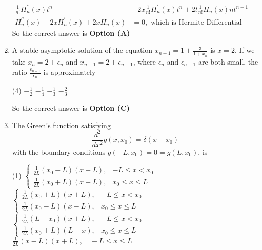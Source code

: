 \begin{enumerate}[label=\color{ocre}\textbf{\arabic*.}]
\begin{answer}
\begin{align*}
		\frac{1}{n !} H_{n}^{\prime \prime}(x) t^{n}&-2 x \frac{1}{n !} H_{n}^{\prime}(x) t^{n}+2 t \frac{1}{n !} H_{n}(x) n t^{n-1}\\
		H_{n}^{\prime \prime}(x)-2 x H_{n}^{\prime}(x)+2 x H_{n}(x)&=0,\text{ which is Hermite Differential Equation.}
		\end{align*}
		So the correct answer is \textbf{Option (A)}
	\end{answer}
	\item A stable asymptotic solution of the equation $x_{n+1}=1+\frac{3}{1+x_{n}}$ is $x=2$. If we take $x_{n}=2+\epsilon_{n}$ and $x_{n+1}=2+\epsilon_{n+1}$, where $\epsilon_{n}$ and $\epsilon_{n+1}$ are both small, the ratio $\frac{\epsilon_{n+1}}{\epsilon_{n}}$ is approximately
	{}
	\begin{tasks}(4)
		\task[\textbf{A.}] $-\frac{1}{2}$
		\task[\textbf{B.}] $-\frac{1}{4}$
		\task[\textbf{C.}]  $-\frac{1}{3}$
		\task[\textbf{D.}] $-\frac{2}{3}$
	\end{tasks}
	\begin{answer}
		So the correct answer is \textbf{Option (C)}
	\end{answer}
	\item  The Green's function satisfying
	$$
	\frac{d^{2}}{d x^{2}} g\left(x, x_{0}\right)=\delta\left(x-x_{0}\right)
	$$
	with the boundary conditions $g\left(-L, x_{0}\right)=0=g\left(L, x_{0}\right)$, is
	{}
	\begin{tasks}(1)
		\task[\textbf{A.}] $\left\{\begin{array}{ll}\frac{1}{2 L}\left(x_{0}-L\right)(x+L), & -L \leq x<x_{0} \\ \frac{1}{2 L}\left(x_{0}+L\right)(x-L), & x_{0} \leq x \leq L\end{array}\right.$
		\task[\textbf{B.}]  $\left\{\begin{array}{ll}\frac{1}{2 L}\left(x_{0}+L\right)(x+L), & -L \leq x<x_{0} \\ \frac{1}{2 L}\left(x_{0}-L\right)(x-L), & x_{0} \leq x \leq L\end{array}\right.$
		\task[\textbf{C.}] $\left\{\begin{array}{ll}\frac{1}{2 L}\left(L-x_{0}\right)(x+L), & -L \leq x<x_{0} \\ \frac{1}{2 L}\left(x_{0}+L\right)(L-x), & x_{0} \leq x \leq L\end{array}\right.$
		\task[\textbf{D.}] $\frac{1}{2 L}(x-L)(x+L), \quad-L \leq x \leq L$
	\end{tasks}
	\begin{answer}

\end{answer}
\end{enumerate}

